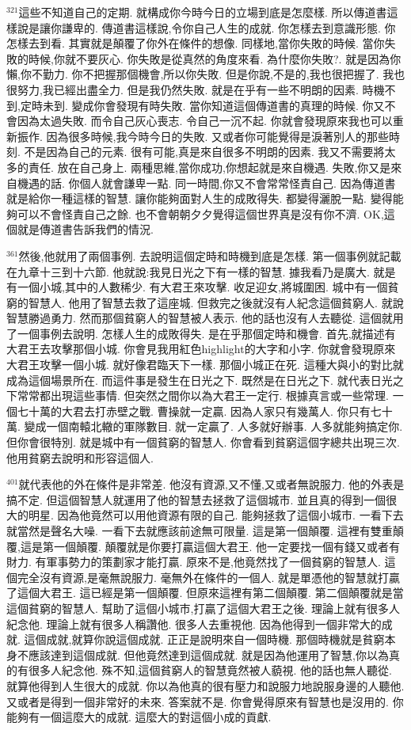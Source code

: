 \documentclass{book}
\begin{document}
$^{321}$這些不知道自己的定期.
就構成你今時今日的立場到底是怎麼樣.
所以傳道書這樣說是讓你謙卑的.
傳道書這樣說,令你自己人生的成就.
你怎樣去到意識形態.
你怎樣去到看.
其實就是顛覆了你外在條件的想像.
同樣地,當你失敗的時候.
當你失敗的時候,你就不要灰心.
你失敗是從真然的角度來看.
為什麼你失敗?.
就是因為你懶,你不勤力.
你不把握那個機會,所以你失敗.
但是你說,不是的,我也很把握了.
我也很努力,我已經出盡全力.
但是我仍然失敗.
就是在乎有一些不明朗的因素.
時機不到,定時未到.
變成你會發現有時失敗.
當你知道這個傳道書的真理的時候.
你又不會因為太過失敗.
而令自己灰心喪志.
令自己一沉不起.
你就會發現原來我也可以重新振作.
因為很多時候,我今時今日的失敗.
又或者你可能覺得是淚著別人的那些時刻.
不是因為自己的元素.
很有可能,真是來自很多不明朗的因素.
我又不需要將太多的責任.
放在自己身上.
兩種思維,當你成功,你想起就是來自機遇.
失敗,你又是來自機遇的話.
你個人就會謙卑一點.
同一時間,你又不會常常怪責自己.
因為傳道書就是給你一種這樣的智慧.
讓你能夠面對人生的成敗得失.
都變得灑脫一點.
變得能夠可以不會怪責自己之餘.
也不會朝朝夕夕覺得這個世界真是沒有你不濟.
OK,這個就是傳道書告訴我們的情況.

$^{361}$然後,他就用了兩個事例.
去說明這個定時和時機到底是怎樣.
第一個事例就記載在九章十三到十六節.
他就說:我見日光之下有一樣的智慧.
據我看乃是廣大.
就是有一個小城,其中的人數稀少.
有大君王來攻擊.
收足迎女,將城圍困.
城中有一個貧窮的智慧人.
他用了智慧去救了這座城.
但救完之後就沒有人紀念這個貧窮人.
就說智慧勝過勇力.
然而那個貧窮人的智慧被人表示.
他的話也沒有人去聽從.
這個就用了一個事例去說明.
怎樣人生的成敗得失.
是在乎那個定時和機會.
首先,就描述有大君王去攻擊那個小城.
你會見我用紅色highlight的大字和小字.
你就會發現原來大君王攻擊一個小城.
就好像君臨天下一樣.
那個小城正在死.
這種大與小的對比就成為這個場景所在.
而這件事是發生在日光之下.
既然是在日光之下.
就代表日光之下常常都出現這些事情.
但突然之間你以為大君王一定行.
根據真言或一些常理.
一個七十萬的大君去打赤壁之戰.
曹操就一定贏.
因為人家只有幾萬人.
你只有七十萬.
變成一個南轅北轍的軍隊數目.
就一定贏了.
人多就好辦事.
人多就能夠搞定你.
但你會很特別.
就是城中有一個貧窮的智慧人.
你會看到貧窮這個字總共出現三次.
他用貧窮去說明和形容這個人.

$^{401}$就代表他的外在條件是非常差.
他沒有資源,又不懂,又或者無說服力.
他的外表是搞不定.
但這個智慧人就運用了他的智慧去拯救了這個城市.
並且真的得到一個很大的明星.
因為他竟然可以用他資源有限的自己.
能夠拯救了這個小城市.
一看下去就當然是聲名大噪.
一看下去就應該前途無可限量.
這是第一個顛覆.
這裡有雙重顛覆,這是第一個顛覆.
顛覆就是你要打贏這個大君王.
他一定要找一個有錢又或者有財力.
有軍事勢力的策劃家才能打贏.
原來不是,他竟然找了一個貧窮的智慧人.
這個完全沒有資源,是毫無說服力.
毫無外在條件的一個人.
就是單憑他的智慧就打贏了這個大君王.
這已經是第一個顛覆.
但原來這裡有第二個顛覆.
第二個顛覆就是當這個貧窮的智慧人.
幫助了這個小城市,打贏了這個大君王之後.
理論上就有很多人紀念他.
理論上就有很多人稱讚他.
很多人去重視他.
因為他得到一個非常大的成就.
這個成就,就算你說這個成就.
正正是說明來自一個時機.
那個時機就是貧窮本身不應該達到這個成就.
但他竟然達到這個成就.
就是因為他運用了智慧,你以為真的有很多人紀念他.
殊不知,這個貧窮人的智慧竟然被人藐視.
他的話也無人聽從.
就算他得到人生很大的成就.
你以為他真的很有壓力和說服力地說服身邊的人聽他.
又或者是得到一個非常好的未來.
答案就不是.
你會覺得原來有智慧也是沒用的.
你能夠有一個這麼大的成就.
這麼大的對這個小成的貢獻.
\end{document}
